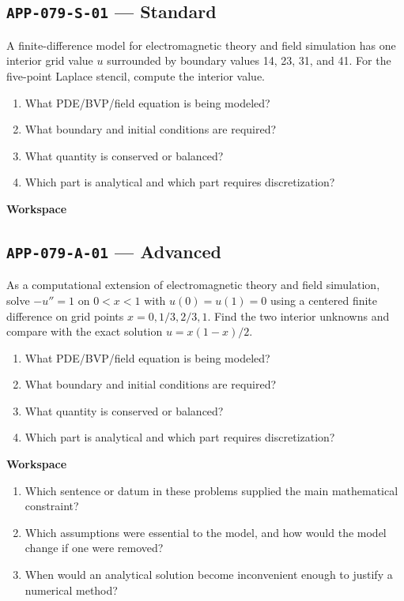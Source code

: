 \documentclass[11pt]{book}
\newcommand{\pid}[1]{\texttt{#1}}
\newcommand{\workspace}{\par\vspace{0.7in}\hrulefill\par\vspace{0.55in}\hrulefill\par}
\begin{document}
\subsection*{\pid{APP-079-S-01} — Standard}
\begin{problembox}
A finite-difference model for electromagnetic theory and field simulation has one interior grid value $u$ surrounded by boundary values 14, 23, 31, and 41. For the five-point Laplace stencil, compute the interior value.
\end{problembox}
\begin{promptbox}\begin{enumerate}
\item What PDE/BVP/field equation is being modeled?
\item What boundary and initial conditions are required?
\item What quantity is conserved or balanced?
\item Which part is analytical and which part requires discretization?
\end{enumerate}\end{promptbox}
\textbf{Workspace}\workspace
{}
\subsection*{\pid{APP-079-A-01} — Advanced}
\begin{problembox}
As a computational extension of electromagnetic theory and field simulation, solve $-u''=1$ on $0<x<1$ with $u(0)=u(1)=0$ using a centered finite difference on grid points $x=0,1/3,2/3,1$. Find the two interior unknowns and compare with the exact solution $u=x(1-x)/2$.
\end{problembox}
\begin{promptbox}\begin{enumerate}
\item What PDE/BVP/field equation is being modeled?
\item What boundary and initial conditions are required?
\item What quantity is conserved or balanced?
\item Which part is analytical and which part requires discretization?
\end{enumerate}\end{promptbox}
\textbf{Workspace}\workspace
\begin{reflectionbox}\begin{enumerate}
\item Which sentence or datum in these problems supplied the main mathematical constraint?
\item Which assumptions were essential to the model, and how would the model change if one were removed?
\item When would an analytical solution become inconvenient enough to justify a numerical method?
\end{enumerate}\end{reflectionbox}
\end{document}

